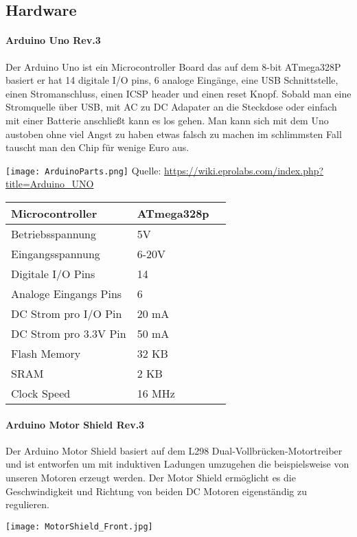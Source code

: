 \documentclass[12pt]{article}
\newcommand*{\quelle}{%
  \footnotesize Quelle: 
}
\begin{document}
\subsection{Hardware}
\paragraph{Arduino Uno Rev.3} Der Arduino Uno ist ein Microcontroller Board das auf dem 8-bit ATmega328P basiert er hat 14 digitale I/O pins, 6 analoge Eingänge, eine USB Schnittstelle, einen Stromanschluss, einen ICSP header und einen reset Knopf. Sobald man eine Stromquelle über USB, mit AC zu DC Adapater an die Steckdose  oder einfach mit einer Batterie anschließt kann es los gehen. Man kann sich mit dem Uno austoben ohne viel Angst zu haben etwas falsch zu machen im schlimmsten Fall tauscht man den Chip für wenige Euro aus.

\texttt{[image: ArduinoParts.png]}
\quelle\url{https://wiki.eprolabs.com/index.php?title=Arduino_UNO}

\vspace{0.5cm}
\begin{tabularx}{\columnwidth}{XXl}
  Microcontroller&ATmega328p\\
  \hline
  Betriebsspannung&5V\\
  \hline
  Eingangsspannung&6-20V\\
  \hline
  Digitale I/O Pins&14\\
  \hline
  Analoge Eingangs Pins&6\\
  \hline
  DC Strom pro I/O Pin&20 mA\\
  \hline
  DC Strom pro 3.3V Pin&50 mA\\
  \hline
  Flash Memory&32 KB\\
  \hline
  SRAM&2 KB\\
  \hline
  Clock Speed&16 MHz\\
\end{tabularx}
\newpage

\paragraph{Arduino Motor Shield Rev.3} Der Arduino Motor Shield basiert auf dem L298 Dual-Vollbrücken-Motortreiber und ist entworfen um mit induktiven Ladungen umzugehen die beispielsweise von unseren Motoren erzeugt werden. Der Motor Shield ermöglicht es die Geschwindigkeit und Richtung von beiden DC Motoren eigenständig zu regulieren.

\vspace{0.5cm}
\texttt{[image: MotorShield\_Front.jpg]}
\end{document}
